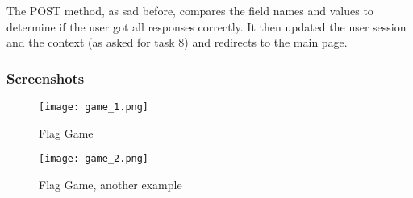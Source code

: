The POST method, as sad before, compares the field names and values to determine if the user got all responses correctly. It then updated the user session and the context (as asked for task 8) and redirects to the main page.


\subsubsection{Screenshots}
\begin{figure}[H]
  \centering
  \texttt{[image: game\_1.png]}
  \caption{Flag Game}
\end{figure}
\begin{figure}[H]
  \centering
  \texttt{[image: game\_2.png]}
  \caption{Flag Game, another example}
\end{figure}